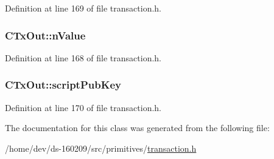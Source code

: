 Definition at line 169 of file transaction.\+h.

\hypertarget{class_c_tx_out_ab278ecef3817a972cb6bc5360d13f197}{}
\subsubsection[{n\+Value}]{ C\+Tx\+Out\+::n\+Value}\label{class_c_tx_out_ab278ecef3817a972cb6bc5360d13f197}


Definition at line 168 of file transaction.\+h.

\hypertarget{class_c_tx_out_a25bf3f2f4befb22a6a0be45784fe57e2}{}
\subsubsection[{script\+Pub\+Key}]{ C\+Tx\+Out\+::script\+Pub\+Key}\label{class_c_tx_out_a25bf3f2f4befb22a6a0be45784fe57e2}


Definition at line 170 of file transaction.\+h.



The documentation for this class was generated from the following file\+:\begin{DoxyCompactItemize}
\item 
/home/dev/ds-\/160209/src/primitives/\hyperlink{transaction_8h}{transaction.\+h}\end{DoxyCompactItemize}
